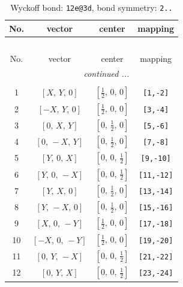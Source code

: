 \documentclass[fleqn,8pt]{jsarticle}
\begin{document}
\renewcommand{\arraystretch}{1.2}
\begin{longtable}{cccc}
\caption{Wyckoff bond: {\tt 12e@3d}, bond symmetry: {\tt 2..}}
 \\
 \hline \hline
No. & vector & center & mapping \\ \hline \endfirsthead

\multicolumn{3}{l}{\tablename\ \thetable{}} \\
 \hline \hline
No. & vector & center & mapping \\ \hline \endhead

 \hline \hline
\multicolumn{3}{r}{\footnotesize\it continued ...} \\ \endfoot

 \hline \hline
\multicolumn{3}{r}{} \\ \endlastfoot

1 & $\left[ X,\, Y,\, 0 \right]$ & $\left[ \frac{1}{2},\, 0,\, 0 \right]$ & {\tt [1,-2]} \\ \hline
2 & $\left[ - X,\, Y,\, 0 \right]$ & $\left[ \frac{1}{2},\, 0,\, 0 \right]$ & {\tt [3,-4]} \\ \hline
3 & $\left[ 0,\, X,\, Y \right]$ & $\left[ 0,\, \frac{1}{2},\, 0 \right]$ & {\tt [5,-6]} \\ \hline
4 & $\left[ 0,\, - X,\, Y \right]$ & $\left[ 0,\, \frac{1}{2},\, 0 \right]$ & {\tt [7,-8]} \\ \hline
5 & $\left[ Y,\, 0,\, X \right]$ & $\left[ 0,\, 0,\, \frac{1}{2} \right]$ & {\tt [9,-10]} \\ \hline
6 & $\left[ Y,\, 0,\, - X \right]$ & $\left[ 0,\, 0,\, \frac{1}{2} \right]$ & {\tt [11,-12]} \\ \hline
7 & $\left[ Y,\, X,\, 0 \right]$ & $\left[ 0,\, \frac{1}{2},\, 0 \right]$ & {\tt [13,-14]} \\ \hline
8 & $\left[ Y,\, - X,\, 0 \right]$ & $\left[ 0,\, \frac{1}{2},\, 0 \right]$ & {\tt [15,-16]} \\ \hline
9 & $\left[ X,\, 0,\, - Y \right]$ & $\left[ \frac{1}{2},\, 0,\, 0 \right]$ & {\tt [17,-18]} \\ \hline
10 & $\left[ - X,\, 0,\, - Y \right]$ & $\left[ \frac{1}{2},\, 0,\, 0 \right]$ & {\tt [19,-20]} \\ \hline
11 & $\left[ 0,\, Y,\, - X \right]$ & $\left[ 0,\, 0,\, \frac{1}{2} \right]$ & {\tt [21,-22]} \\ \hline
12 & $\left[ 0,\, Y,\, X \right]$ & $\left[ 0,\, 0,\, \frac{1}{2} \right]$ & {\tt [23,-24]} \\
\end{longtable}
\end{document}
